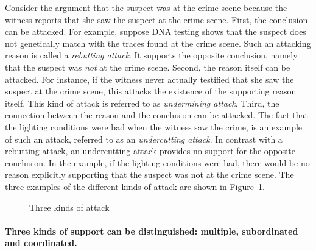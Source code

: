 \documentclass[10pt]{article}
\begin{document}
Consider the argument that the suspect was at the crime scene because the witness reports that she saw the suspect at the crime scene. 
First, the conclusion can be attacked. %
For example, suppose DNA testing shows that the suspect does not genetically match 
with the traces found at the crime scene. 
Such an attacking reason is called a \textit{rebutting attack}. 
It supports the opposite conclusion, namely that the suspect was \textit{not} 
at the crime scene. 
%
Second, the reason itself can be attacked. 
 For instance, %
 if the witness never actually testified that she saw the suspect at the crime scene, this attacks the existence of the supporting reason itself. 
 This kind of attack is referred to as \textit{undermining attack}. 
%
Third, the connection between the reason and the conclusion can be attacked.
 The fact that the lighting conditions were bad when the witness saw the crime, 
 is an example of such an attack, referred to as an \textit{undercutting attack}.
 In contrast with a rebutting attack, an undercutting attack provides no support for the opposite conclusion. In the example, %
 if the lighting conditions were bad, there would be no reason explicitly 
 supporting that the suspect was not at the crime scene. 
%
The three examples of the different kinds of attack are shown in Figure~\ref{fig:arg3}.

\begin{figure}[bt]
\centering

\caption{Three kinds of attack\label{fig:arg3}}
\end{figure}

\paragraph{Three kinds of support can be distinguished: multiple, subordinated and coordinated.}
\end{document}
